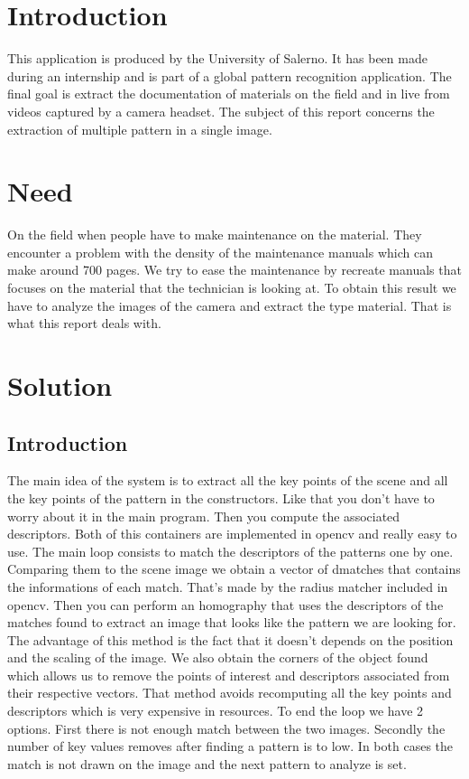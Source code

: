 \documentclass[english,a4paper,11pt]{report}
\begin{document}
\chapter{Introduction}
	This application is produced by the University of Salerno. It has been made during an internship and is part of a global pattern recognition application. The final goal is extract the documentation of materials on the field and in live from videos captured by a camera headset. The subject of this report concerns the extraction of multiple pattern in a single image.

\chapter{Need}
	On the field when people have to make maintenance on the material. They encounter a problem with the density of the maintenance manuals which can make around 700 pages. We try to ease the maintenance by recreate manuals that focuses on the material that the technician is looking at. To obtain this result we have to analyze the images of the camera and extract the type material. That is what this report deals with.


\chapter{Solution}
\section{Introduction}
 The main idea of the system is to extract all the key points of the scene and all the key points of the pattern in the constructors. Like that you don't have to worry about it in the main program. 
Then you compute the associated descriptors. Both of this containers are implemented in opencv and really easy to use. 
The main loop consists to match the descriptors of the patterns one by one. Comparing them to the scene image we obtain a vector of dmatches that contains the informations of each match. That's made by the radius matcher included in opencv. 
Then you can perform an homography  that uses the descriptors of the matches found to extract an image that looks like the pattern we are looking for. The advantage of this method is the fact that it doesn't depends on the position and the scaling of the image. We also obtain the corners of the object found which allows us to remove the points of interest and descriptors associated from their respective vectors. That method avoids recomputing all the key points and descriptors which is very expensive in resources. 
To end the loop we have 2 options. First there is not enough match between the two images. Secondly the number of key values removes after finding a pattern is to low. In both cases the match is not drawn on the image and the next pattern to analyze is set.
\end{document}
